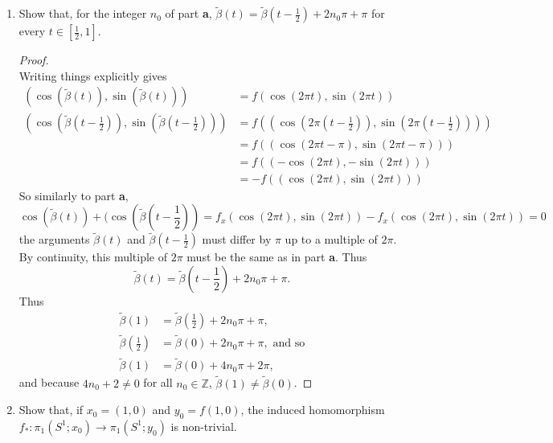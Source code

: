 \documentclass{article}
\newenvironment{problem}[2][Problem]{\begin{trivlist}
\item[\hskip \labelsep {\bfseries #1}\hskip \labelsep {\bfseries #2.}]}{\end{trivlist}}
\begin{document}
\begin{problem}{1}
\begin{enumerate}[label=\textbf{\alph*.}]
    \item Show that, for the integer $n_0$ of part \textbf{a},
    $\widetilde\beta(t) = \widetilde\beta(t - \frac{1}{2}) + 2n_0\pi + \pi$ for
    every $t \in \left[\frac{1}{2}, 1\right]$.
      \begin{proof} \text{} \\
        Writing things explicitly gives \begin{align*}
          (\cos(\widetilde\beta(t)), \sin(\widetilde\beta(t)))
          &= f(\cos(2\pi t), \sin(2\pi t)) \\
          \textstyle(\cos(\widetilde\beta(t - \frac{1}{2})), \sin(\widetilde\beta(t - \frac{1}{2})))
          &= f(\textstyle(\cos(2\pi (t - \frac{1}{2})), \sin(2\pi (t - \frac{1}{2})))) \\
          &= f(\textstyle(\cos(2\pi t - \pi), \sin(2\pi t - \pi))) \\
          &= f(\textstyle(-\cos(2\pi t), -\sin(2\pi t))) \\
          &= -f(\textstyle(\cos(2\pi t), \sin(2\pi t)))
        \end{align*}
        So similarly to part \textbf{a}, \[
          \cos(\widetilde\beta(t)) + \textstyle(\cos(\widetilde\beta(t - \frac{1}{2}))
          = f_x(\cos(2\pi t), \sin(2\pi t)) - f_x(\cos(2\pi t), \sin(2\pi t))
          = 0
        \]
        the arguments $\widetilde\beta(t)$ and $\widetilde\beta(t - \frac{1}{2})$
        must differ by $\pi$ up to a multiple of $2\pi$. By continuity, this
        multiple of $2\pi$ must be the same as in part \textbf{a}.
        Thus
        \[
          \widetilde\beta(t) = \widetilde\beta(t - \textstyle\frac{1}{2}) + 2n_0\pi + \pi.
        \]
        Thus \begin{align*}
          \widetilde\beta(1)                 &= \textstyle\widetilde\beta(\frac12) + 2n_0\pi + \pi,\\
          \textstyle\widetilde\beta(\frac12) &= \widetilde\beta(0) + 2n_0\pi + \pi, \text{ and so} \\
          \textstyle\widetilde\beta(1)       &= \widetilde\beta(0) + 4n_0\pi + 2\pi,
        \end{align*}
        and because $4n_0 + 2 \neq 0$ for all $n_0 \in \mathbb Z$,
        $\widetilde\beta(1) \neq \widetilde\beta(0)$.
      \end{proof}
    \item Show that, if $x_0 = (1, 0)$ and $y_0 = f(1, 0)$, the induced
    homomorphism $f_*\colon\pi_1(S^1;x_0)\rightarrow\pi_1(S^1;y_0)$ is
    non-trivial.

\end{enumerate}
\end{problem}
\end{document}
